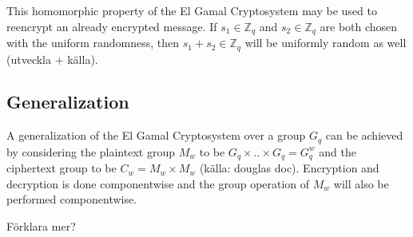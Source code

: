 This homomorphic property of the El Gamal Cryptosystem may be used to
reencrypt an already encrypted message. If $s_1 \in \mathbb{Z}_q$ and
$s_2 \in \mathbb{Z}_q$ are both chosen with the uniform randomness,
then $s_1 + s_2 \in \mathbb{Z}_q$ will be uniformly random as well
(utveckla + källa).

\subsection{Generalization}
A generalization of the El Gamal Cryptosystem over a group $G_q$ can
be achieved by considering the plaintext group $M_w$ to be $G_q \times
.. \times G_q = G_q^w$ and the ciphertext group to be $C_w = M_w
\times M_w$ (källa: douglas doc). Encryption and decryption is done
componentwise and the group operation of $M_w$ will also be performed
componentwise. 
 
Förklara mer?
